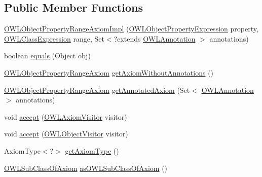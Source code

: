 \subsection*{Public Member Functions}
\begin{DoxyCompactItemize}
\item 
\hyperlink{classuk_1_1ac_1_1manchester_1_1cs_1_1owl_1_1owlapi_1_1_o_w_l_object_property_range_axiom_impl_a538413d0d3acd01949174147762c344e}{O\-W\-L\-Object\-Property\-Range\-Axiom\-Impl} (\hyperlink{interfaceorg_1_1semanticweb_1_1owlapi_1_1model_1_1_o_w_l_object_property_expression}{O\-W\-L\-Object\-Property\-Expression} property, \hyperlink{interfaceorg_1_1semanticweb_1_1owlapi_1_1model_1_1_o_w_l_class_expression}{O\-W\-L\-Class\-Expression} range, Set$<$?extends \hyperlink{interfaceorg_1_1semanticweb_1_1owlapi_1_1model_1_1_o_w_l_annotation}{O\-W\-L\-Annotation} $>$ annotations)
\item 
boolean \hyperlink{classuk_1_1ac_1_1manchester_1_1cs_1_1owl_1_1owlapi_1_1_o_w_l_object_property_range_axiom_impl_ab1d843d26c883af68cc2fecc3ed44628}{equals} (Object obj)
\item 
\hyperlink{interfaceorg_1_1semanticweb_1_1owlapi_1_1model_1_1_o_w_l_object_property_range_axiom}{O\-W\-L\-Object\-Property\-Range\-Axiom} \hyperlink{classuk_1_1ac_1_1manchester_1_1cs_1_1owl_1_1owlapi_1_1_o_w_l_object_property_range_axiom_impl_a48c2e560c0be2717094fe0b2d464196e}{get\-Axiom\-Without\-Annotations} ()
\item 
\hyperlink{interfaceorg_1_1semanticweb_1_1owlapi_1_1model_1_1_o_w_l_object_property_range_axiom}{O\-W\-L\-Object\-Property\-Range\-Axiom} \hyperlink{classuk_1_1ac_1_1manchester_1_1cs_1_1owl_1_1owlapi_1_1_o_w_l_object_property_range_axiom_impl_a0f1c52a046e64b4f5038badb3656a8c9}{get\-Annotated\-Axiom} (Set$<$ \hyperlink{interfaceorg_1_1semanticweb_1_1owlapi_1_1model_1_1_o_w_l_annotation}{O\-W\-L\-Annotation} $>$ annotations)
\item 
void \hyperlink{classuk_1_1ac_1_1manchester_1_1cs_1_1owl_1_1owlapi_1_1_o_w_l_object_property_range_axiom_impl_af330c0f5598c47f091ea189c02007d30}{accept} (\hyperlink{interfaceorg_1_1semanticweb_1_1owlapi_1_1model_1_1_o_w_l_axiom_visitor}{O\-W\-L\-Axiom\-Visitor} visitor)
\item 
void \hyperlink{classuk_1_1ac_1_1manchester_1_1cs_1_1owl_1_1owlapi_1_1_o_w_l_object_property_range_axiom_impl_ac20c3a4969498713f92bc1b7a233155c}{accept} (\hyperlink{interfaceorg_1_1semanticweb_1_1owlapi_1_1model_1_1_o_w_l_object_visitor}{O\-W\-L\-Object\-Visitor} visitor)
\item 
Axiom\-Type$<$?$>$ \hyperlink{classuk_1_1ac_1_1manchester_1_1cs_1_1owl_1_1owlapi_1_1_o_w_l_object_property_range_axiom_impl_ab53b48a1ed57ed7771c9ccb58bfc9d5e}{get\-Axiom\-Type} ()
\item 
\hyperlink{interfaceorg_1_1semanticweb_1_1owlapi_1_1model_1_1_o_w_l_sub_class_of_axiom}{O\-W\-L\-Sub\-Class\-Of\-Axiom} \hyperlink{classuk_1_1ac_1_1manchester_1_1cs_1_1owl_1_1owlapi_1_1_o_w_l_object_property_range_axiom_impl_ab1a09aee76be01843ae435eab3ef050b}{as\-O\-W\-L\-Sub\-Class\-Of\-Axiom} ()
\end{DoxyCompactItemize}
